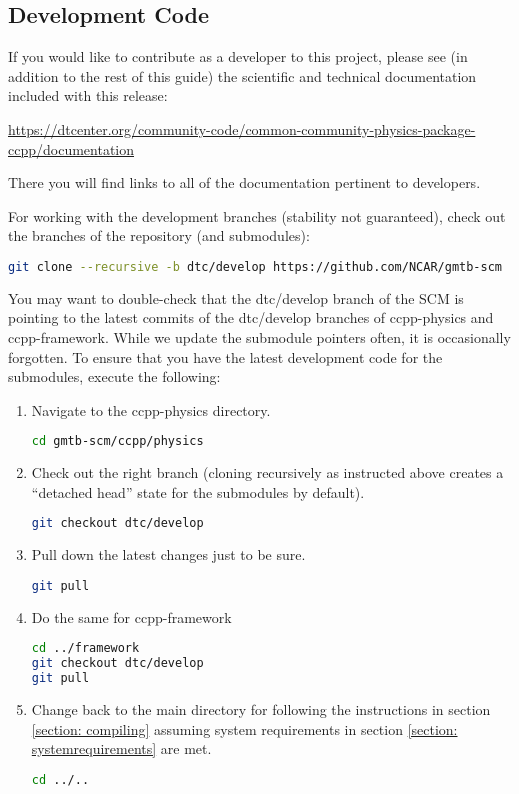 \subsection{Development Code}

If you would like to contribute as a developer to this project, please see (in addition to the rest of this guide) the scientific and technical documentation included with this release:

\url{https://dtcenter.org/community-code/common-community-physics-package-ccpp/documentation}

There you will find links to all of the documentation pertinent to developers.

For working with the development branches (stability not guaranteed), check out the  branches of the repository (and submodules):
\begin{lstlisting}[language=bash]
git clone --recursive -b dtc/develop https://github.com/NCAR/gmtb-scm
\end{lstlisting}
You may want to double-check that the dtc/develop branch of the SCM is pointing to the latest commits of the dtc/develop branches of ccpp-physics and ccpp-framework. While we update the submodule pointers often, it is occasionally forgotten. To ensure that you have the latest development code for the submodules, execute the following:
\begin{enumerate}
\item Navigate to the ccpp-physics directory.
\begin{lstlisting}[language=bash]
cd gmtb-scm/ccpp/physics
\end{lstlisting}
\item Check out the right branch (cloning recursively as instructed above creates a ``detached head'' state for the submodules by default).
\begin{lstlisting}[language=bash]
git checkout dtc/develop
\end{lstlisting}
\item Pull down the latest changes just to be sure.
\begin{lstlisting}[language=bash]
git pull
\end{lstlisting}
\item Do the same for ccpp-framework
\begin{lstlisting}[language=bash]
cd ../framework
git checkout dtc/develop
git pull
\end{lstlisting}
\item Change back to the main directory for following the instructions in section \ref{section: compiling} assuming system requirements in section \ref{section: systemrequirements} are met.
\begin{lstlisting}[language=bash]
cd ../..
\end{lstlisting}
\end{enumerate}


